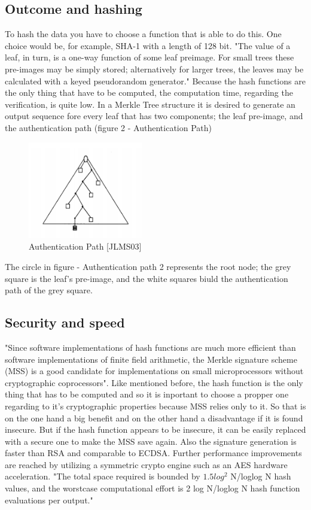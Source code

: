 \subsection{Outcome and hashing}
To hash the data you have to choose a function that is able to do this. One choice would be, for example, SHA-1 with a length of 128 bit.
"The value of a leaf, in turn, is a one-way function of some leaf preimage. For small trees these pre-images may be simply stored; alternatively for larger trees, the leaves may be calculated with a keyed pseudorandom generator." \cite{MT} Because the hash functions are the only thing that have to be computed, the computation time, regarding the verification, is quite low. \cite{METR} In a Merkle Tree structure it is desired to generate an output sequence fore every leaf that has two components; the leaf pre-image, and the authentication path (figure 2 - Authentication Path) \cite{MT}

\begin{figure}
\centering
\includegraphics[width=5cm]{Pages/Merkle/API.png}
\caption{Authentication Path [JLMS03]}
\end{figure}

The circle in figure - Authentication path 2 represents the root node; the grey square is the leaf’s pre-image, and the white squares biuld the authentication path of the grey square.

\subsection{Security and speed}
"Since software implementations of hash functions are much more efficient than software implementations of finite field arithmetic, the Merkle signature scheme (MSS) is a good candidate for implementations on small microprocessors without cryptographic coprocessors". \cite{FHB} Like mentioned before, the hash function is the only thing that has to be computed and so it is inportant to choose a propper one regarding to it’s cryptographic properties because MSS relies only to it. So that is on the one hand a big benefit and on the other hand a disadvantage if it is found insecure. But if the hash function appears to be insecure, it can be easily replaced with a secure one to make the MSS save again. Also the signature generation is faster than RSA and comparable to ECDSA. Further performance improvements are reached by utilizing a symmetric crypto engine such as an AES hardware acceleration. \cite{FHB}  "The total space
required is bounded by $ 1.5 log^2 $  N/loglog N hash values, and the worstcase computational effort is 2 log N/loglog N hash function evaluations
per output." \cite{MT}

